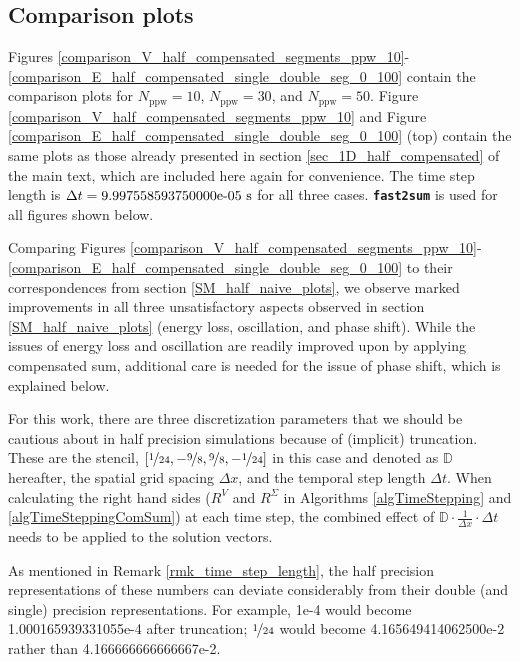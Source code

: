 \subsection{Comparison plots}\label{SM_half_compensated_plots}

Figures \ref{comparison_V_half_compensated_segments_ppw_10}-\ref{comparison_E_half_compensated_single_double_seg_0_100} contain the comparison plots for $N_\text{ppw}=10$, $N_\text{ppw}=30$, and $N_\text{ppw}=50$.
%
Figure \ref{comparison_V_half_compensated_segments_ppw_10} and Figure \ref{comparison_E_half_compensated_single_double_seg_0_100} (top) contain the same plots as those already presented in section \ref{sec_1D_half_compensated} of the main text, which are included here again for convenience.
%
The time step length is $\Delta t = \text{\rm9.997558593750000e-05 s}$ for all three cases.
%
\textbf{\texttt{\small fast2sum}} is used for all figures shown below.


Comparing Figures \ref{comparison_V_half_compensated_segments_ppw_10}-\ref{comparison_E_half_compensated_single_double_seg_0_100} to their correspondences from section \ref{SM_half_naive_plots}, we observe marked improvements in all three unsatisfactory aspects observed in section \ref{SM_half_naive_plots} (energy loss, oscillation\footnotemark, and phase shift).
%
While the issues of energy loss and oscillation are readily improved upon by applying compensated sum, additional care is needed for the issue of phase shift, which is explained below.
%


For this work, there are three discretization parameters that we should be cautious about in half precision simulations because of (implicit) truncation.
%
These are the stencil, $[\nicefrac{1}{24}, -\nicefrac{9}{8}, \nicefrac{9}{8}, -\nicefrac{1}{24}]$ in this case and denoted as $\mathbb D$ hereafter, the spatial grid spacing $\Delta x$, and the temporal step length $\Delta t$.
%
When calculating the right hand sides ($R^V$ and $R^\Sigma$ in Algorithms \ref{algTimeStepping} and \ref{algTimeSteppingComSum}) at each time step, the combined effect of $\mathbb D \cdot \frac{1}{\Delta x} \cdot \Delta t$ needs to be applied to the solution vectors.


As mentioned in Remark \ref{rmk_time_step_length}, the half precision representations of these numbers can deviate considerably from their double (and single) precision representations.
%
For example, {\rm 1e-4} would become {\rm 1.000165939331055e-4} after truncation; $\nicefrac{1}{24}$ would become {\rm 4.165649414062500e-2} rather than {\rm 4.166666666666667e-2}.


